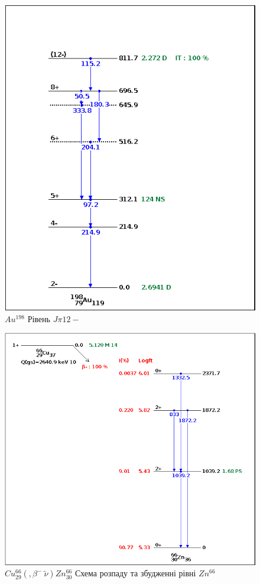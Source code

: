 \documentclass[a4paper, 14pt]{article}
\numberwithin{equation}{section}
\numberwithin{table}{section}
\begin{document}
	\begin{figure}[!]
		\centering \includegraphics[width=1\textwidth]{images/au198levels.png}
		\caption{$Au^{198}$ Рівень $J\pi 12-$} 
		\label{ris:Au198Level12-}	
	\end{figure} 
	\begin{figure}[!]
		\centering \includegraphics[width=1\textwidth]{images/cu66lbetadecay.png}
		\caption{$Cu^{66}_{29}(,\beta^-\  \tilde{\nu})Zn^{66}_{30}$ Схема розпаду та збудженні рівні $Zn^{66}$} 
		\label{ris:ZnLevels-}	
	\end{figure} 
	
\end{document}
